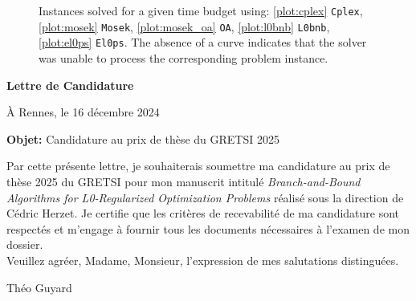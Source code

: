 \documentclass[11pt]{article}
\begin{document}
\begin{figure}[!ht]
    \vspace*{-0.25cm}
    \centering
    
    \vspace*{-0.5cm}
    \caption{Instances solved for a given time budget using: \ref{plot:cplex} \texttt{Cplex}, \ref{plot:mosek} \texttt{Mosek}, \ref{plot:mosek_oa} \texttt{OA}, \ref{plot:l0bnb} \texttt{L0bnb}, \ref{plot:el0ps} \texttt{El0ps}. The absence of a curve indicates that the solver was unable to process the corresponding problem instance.}
    \label{fig:perfprofiles}
    \vspace*{-0.25cm}
\end{figure}


{
    \small
    
}


\clearpage

\thispagestyle{empty}

\vspace*{150pt}
\begin{center}
    \LARGE\bf{Lettre de Candidature}
\end{center}
\vspace*{50pt}
\begin{flushright}
    À Rennes, le 16 décembre 2024
\end{flushright}
\vspace*{20pt}
\textbf{Objet:} Candidature au prix de thèse du GRETSI 2025

\vspace*{20pt}

Par cette présente lettre, je souhaiterais soumettre ma candidature au prix de thèse 2025 du GRETSI pour mon manuscrit intitulé \textit{Branch-and-Bound Algorithms for L0-Regularized Optimization Problems} réalisé sous la direction de Cédric Herzet.
Je certifie que les critères de recevabilité de ma candidature sont respectés et m'engage à fournir tous les documents nécessaires à l'examen de mon dossier.
~\\

Veuillez agréer, Madame, Monsieur, l'expression de mes salutations distinguées.

\vspace*{50pt}
\begin{flushright}
    Théo Guyard
\end{flushright}
\end{document}
